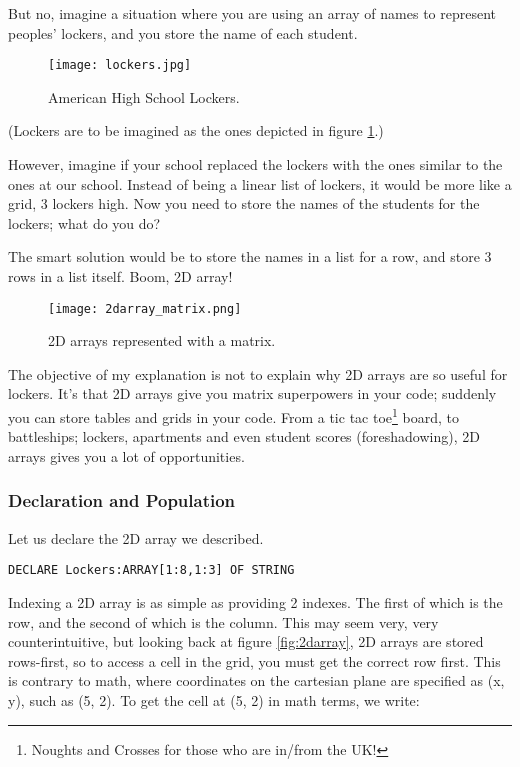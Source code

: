 \documentclass[./main.tex]{subfiles}
\begin{document}
But no, imagine a situation where you are using an array of names to represent peoples' lockers, and you store the name of each student.

\begin{figure}[h]
    \centering
    \texttt{[image: lockers.jpg]}
    \caption{American High School Lockers.}
    \label{fig:lockers}
\end{figure}

(Lockers are to be imagined as the ones depicted in figure \ref{fig:lockers}.)

However, imagine if your school replaced the lockers with the ones similar to the ones at our school. Instead of being a linear list of lockers, it would be more like a grid, 3 lockers high. Now you need to store the names of the students for the lockers; what do you do?

The smart solution would be to store the names in a list for a row, and store 3 rows in a list itself. Boom, 2D array!

\begin{figure}[h]
    \centering
    \texttt{[image: 2darray\_matrix.png]}
    \caption{2D arrays represented with a matrix.}
    \label{fig:2darray_matrix}
\end{figure}

The objective of my explanation is not to explain why 2D arrays are so useful for lockers. It's that 2D arrays give you matrix superpowers in your code; suddenly you can store tables and grids in your code. From a tic tac toe\footnote{Noughts and Crosses for those who are in/from the UK!} board, to battleships; lockers, apartments and even student scores (foreshadowing), 2D arrays gives you a lot of opportunities.

\subsubsection{Declaration and Population}

Let us declare the 2D array we described.

\begin{verbatim}
DECLARE Lockers:ARRAY[1:8,1:3] OF STRING
\end{verbatim}

Indexing a 2D array is as simple as providing 2 indexes. The first of which is the row, and the second of which is the column. This may seem very, very counterintuitive, but looking back at figure \ref{fig:2darray}, 2D arrays are stored rows-first, so to access a cell in the grid, you must get the correct row first. This is contrary to math, where coordinates on the cartesian plane are specified as {\ccmono (x, y)}, such as {\ccmono (5, 2)}. To get the cell at {\ccmono (5, 2)} in math terms, we write:
\end{document}
